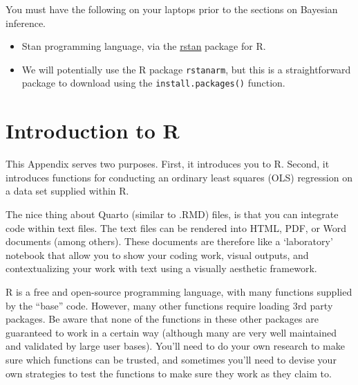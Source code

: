 \documentclass[
  letterpaper,
  DIV=11,
  numbers=noendperiod]{scrreprt}
\providecommand{\tightlist}{%
  \setlength{\itemsep}{0pt}\setlength{\parskip}{0pt}}\usepackage{longtable,booktabs,array}
\begin{document}
\begin{tcolorbox}[enhanced jigsaw, colback=white, title=\textcolor{quarto-callout-important-color}{\faExclamation}\hspace{0.5em}{Prior to Bayesian inference}, left=2mm, coltitle=black, bottomrule=.15mm, arc=.35mm, toprule=.15mm, rightrule=.15mm, opacityback=0, opacitybacktitle=0.6, colframe=quarto-callout-important-color-frame, leftrule=.75mm, toptitle=1mm, titlerule=0mm, breakable, bottomtitle=1mm, colbacktitle=quarto-callout-important-color!10!white]

You must have the following on your laptops prior to the sections on
Bayesian inference.

\end{tcolorbox}

\begin{itemize}
\tightlist
\item
  Stan programming language, via the
  \href{https://mc-stan.org/users/interfaces/rstan.html}{rstan} package
  for R.
\item
  We will potentially use the R package \texttt{rstanarm}, but this is a
  straightforward package to download using the
  \texttt{install.packages()} function.
\end{itemize}

\hypertarget{sec-Rintro}{%
\chapter{Introduction to R}\label{sec-Rintro}}

This Appendix serves two purposes. First, it introduces you to R.
Second, it introduces functions for conducting an ordinary least squares
(OLS) regression on a data set supplied within R.

The nice thing about Quarto (similar to .RMD) files, is that you can
integrate code within text files. The text files can be rendered into
HTML, PDF, or Word documents (among others). These documents are
therefore like a `laboratory' notebook that allow you to show your
coding work, visual outputs, and contextualizing your work with text
using a visually aesthetic framework.

R is a free and open-source programming language, with many functions
supplied by the ``base'' code. However, many other functions require
loading 3rd party packages. Be aware that none of the functions in these
other packages are guaranteed to work in a certain way (although many
are very well maintained and validated by large user bases). You'll need
to do your own research to make sure which functions can be trusted, and
sometimes you'll need to devise your own strategies to test the
functions to make sure they work as they claim to.
\end{document}
